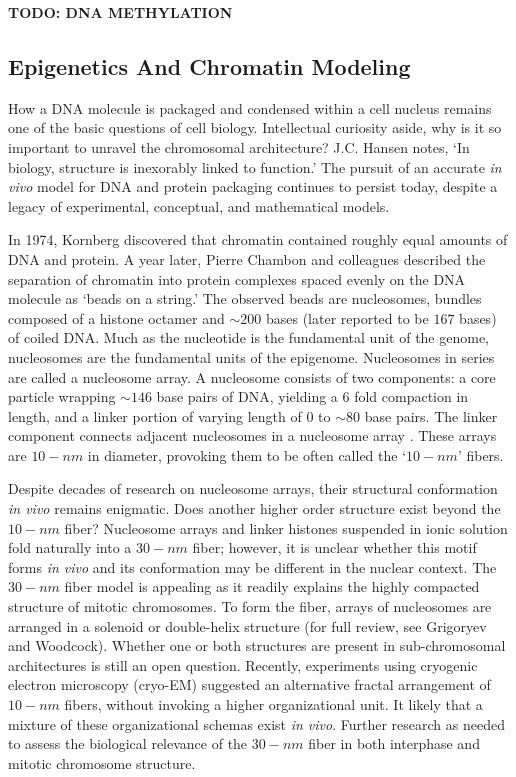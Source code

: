 \documentclass[phd,tocprelim]{cornell}
\begin{document}
\textbf{TODO: DNA METHYLATION}

\subsection{Epigenetics And Chromatin Modeling}

How a DNA molecule is packaged and condensed within a cell nucleus remains
one of the basic questions of cell biology.  Intellectual curiosity aside,
why is it so important to unravel the chromosomal architecture?  J.C. Hansen
notes, `In biology, structure is inexorably linked to function.'\cite{hansen2012}
The pursuit of an accurate \textit{in vivo} model for DNA and protein packaging
continues to persist today, despite a legacy of experimental, conceptual, and
mathematical models.

In 1974, Kornberg discovered that chromatin contained roughly equal amounts of
DNA and protein\cite{kornberg1974}.  A year later, Pierre Chambon and colleagues
described the separation of chromatin into protein complexes spaced evenly on the DNA
molecule as `beads on a string.'\cite{oudet1975}  The observed beads are nucleosomes,
bundles composed of a histone octamer and $\sim200$ bases (later reported to be
$167$ bases\cite{robinson2006}) of coiled DNA\@.
Much as the nucleotide is the fundamental unit of the genome, nucleosomes are
the fundamental units of the epigenome.  Nucleosomes in series are called a
nucleosome array.  A nucleosome consists of two components: a core particle
wrapping $\sim146$ base pairs of DNA, yielding a 6 fold compaction in length,
and a linker portion of varying length of $0$ to $\sim80$ base pairs.  The
linker component connects adjacent nucleosomes in a nucleosome array\cite{wu2007}%
\cite{hansen2012}.  These arrays are $10-nm$ in diameter, provoking them to be
often called the `$10-nm$' fibers.

Despite decades of research on nucleosome arrays, their structural conformation
\textit{in vivo} remains enigmatic.   Does another higher order structure exist
beyond the $10-nm$ fiber?  Nucleosome arrays and linker histones suspended in ionic
solution fold naturally into a $30-nm$ fiber\cite{tremethick2007}; however, it
is unclear whether this motif forms \textit{in vivo} and its conformation may
be different in the nuclear context\cite{bian2012}.  The $30-nm$ fiber model
is appealing as it readily explains the highly compacted structure of mitotic
chromosomes.  To form the fiber, arrays of nucleosomes are arranged in a
solenoid or double-helix structure (for full review, see Grigoryev and
Woodcock\cite{grigoryev2012}).  Whether one or both structures are present in
sub-chromosomal architectures is still an open question\cite{song2014}.  Recently,
experiments using cryogenic electron microscopy (cryo-EM) suggested an
alternative fractal arrangement of $10-nm$ fibers, without invoking a higher
organizational unit\cite{nishino2012}\cite{hansen2012}.  It likely that a
mixture of these organizational schemas exist \textit{in vivo}.  Further
research as needed to assess the biological relevance of the $30-nm$ fiber in
both interphase and mitotic chromosome structure.
\end{document}
